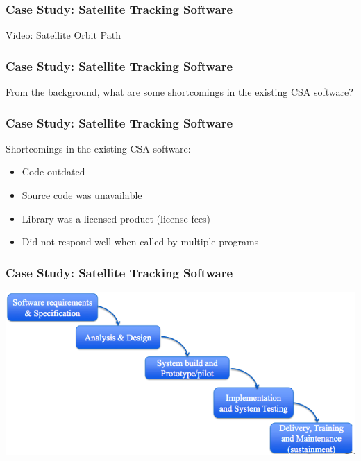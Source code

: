 \begin{frame}
	\frametitle{Case Study: Satellite Tracking Software}
	
	\begin{center}
	Video: Satellite Orbit Path
	\end{center}
	
\end{frame}

\begin{frame}
	\frametitle{Case Study: Satellite Tracking Software}
		\begin{changemargin}{1cm}
	From the background, what are some shortcomings in the existing CSA software? \vspace{2em}
		\end{changemargin}
\end{frame}

\begin{frame}
	\frametitle{Case Study: Satellite Tracking Software}
	
	\begin{changemargin}{1cm}
	Shortcomings in the existing CSA software:
	\begin{itemize}
		\item Code outdated
		\item Source code was unavailable
		\item Library was a licensed product (license fees)
		\item Did not respond well when called by multiple programs
	\end{itemize}
	\end{changemargin}
			
\end{frame}


\begin{frame}
	\frametitle{Case Study: Satellite Tracking Software}
	
	\begin{center}
	\includegraphics[width=1.25\textheight]{images/casestudywf.png}
	\end{center}
	
    
\end{frame}

